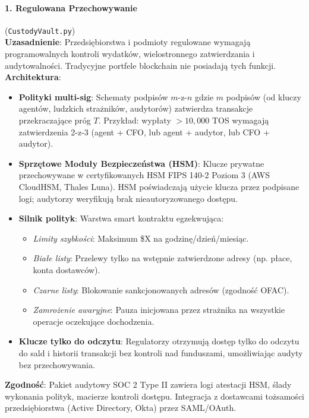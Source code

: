 \documentclass[11pt]{article}
\begin{document}
\paragraph{1. Regulowana Przechowywanie} (\texttt{CustodyVault.py})\\
\textbf{Uzasadnienie}: Przedsiębiorstwa i podmioty regulowane wymagają programowalnych kontroli wydatków, wielostronnego zatwierdzania i audytowalności. Tradycyjne portfele blockchain nie posiadają tych funkcji.\\
\textbf{Architektura}:
\begin{itemize}[noitemsep]
  \item \textbf{Polityki multi-sig}: Schematy podpisów $m$-z-$n$ gdzie $m$ podpisów (od kluczy agentów, ludzkich strażników, audytorów) zatwierdza transakcje przekraczające próg $T$. Przykład: wypłaty $>10,000$ TOS wymagają zatwierdzenia 2-z-3 (agent + CFO, lub agent + audytor, lub CFO + audytor).
  \item \textbf{Sprzętowe Moduły Bezpieczeństwa (HSM)}: Klucze prywatne przechowywane w certyfikowanych HSM FIPS 140-2 Poziom 3 (AWS CloudHSM, Thales Luna). HSM poświadczają użycie klucza przez podpisane logi; audytorzy weryfikują brak nieautoryzowanego dostępu.
  \item \textbf{Silnik polityk}: Warstwa smart kontraktu egzekwująca:
    \begin{itemize}[noitemsep]
      \item \emph{Limity szybkości}: Maksimum \$X na godzinę/dzień/miesiąc.
      \item \emph{Białe listy}: Przelewy tylko na wstępnie zatwierdzone adresy (np. płace, konta dostawców).
      \item \emph{Czarne listy}: Blokowanie sankcjonowanych adresów (zgodność OFAC).
      \item \emph{Zamrożenie awaryjne}: Pauza inicjowana przez strażnika na wszystkie operacje oczekujące dochodzenia.
    \end{itemize}
  \item \textbf{Klucze tylko do odczytu}: Regulatorzy otrzymują dostęp tylko do odczytu do sald i historii transakcji bez kontroli nad funduszami, umożliwiając audyty bez przechowywania.
\end{itemize}
\textbf{Zgodność}: Pakiet audytowy SOC 2 Type II zawiera logi atestacji HSM, ślady wykonania polityk, macierze kontroli dostępu. Integracja z dostawcami tożsamości przedsiębiorstwa (Active Directory, Okta) przez SAML/OAuth.
\end{document}

